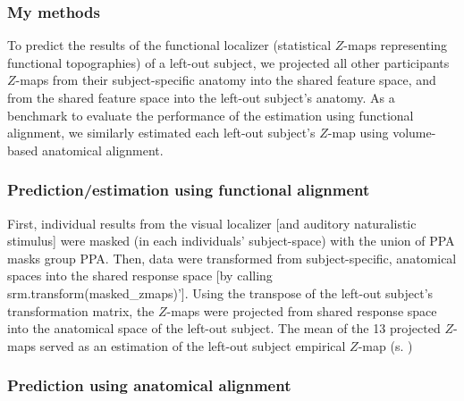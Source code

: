\subsubsection{My methods}


%
To predict the results of the functional localizer (statistical $Z$-maps
representing functional topographies) of a left-out subject, we projected all
other participants $Z$-maps from their subject-specific anatomy into the shared
feature space, and from the shared feature space into the left-out subject's
anatomy.
%
As a benchmark to evaluate the performance of the estimation using functional
alignment, we similarly estimated each left-out subject's $Z$-map using
volume-based anatomical alignment.


\subsubsection{Prediction/estimation using functional alignment}

%
First, individual results from the visual localizer [and auditory naturalistic
stimulus] were masked (in each individuals' subject-space) with the union of PPA
masks group PPA.
%
Then, data were transformed from subject-specific, anatomical spaces into the
shared response space [by calling srm.transform(masked\_zmaps)'].
%
Using the transpose of the left-out subject's transformation matrix, the
$Z$-maps were projected from shared response space into the anatomical space of
the left-out subject.
%
The mean of the 13 projected $Z$-maps served as an estimation of the left-out
subject empirical $Z$-map (s. \citep{sengupta2016extension})


\subsubsection{Prediction using anatomical alignment}



